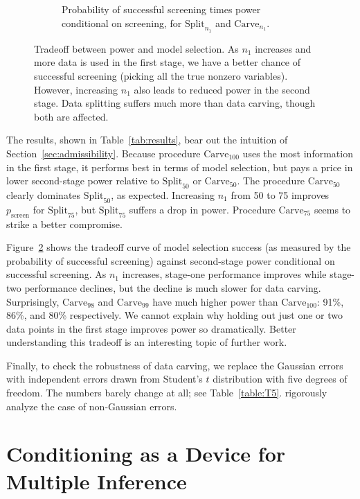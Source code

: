\documentclass{article}
\theoremstyle{definition}
\newcommand{\sampOrData}{data }
\begin{document}
\begin{figure}
\begin{subfigure}[t]{.4\textwidth}
    \caption{Probability of successful screening times power conditional on screening, for $\text{Split}_{n_1}$ and $\text{Carve}_{n_1}$.}
    \label{fig:lassoTRADE2}
  \end{subfigure}
  \caption{Tradeoff between power and model selection.
As $n_1$ increases and more data is used in the first stage, we have a better chance of successful screening (picking all the true nonzero variables). However, increasing $n_1$ also leads to reduced power in the second stage. Data splitting suffers much more than data carving, though both are affected.}
  \label{fig:lassoTRADEOFF}
\end{figure}


The results, shown in Table~\ref{tab:results}, bear out the intuition of Section~\ref{sec:admissibility}.
Because procedure $\text{Carve}_{100}$ uses the most information in the first stage, it performs best in terms of model selection, but pays a price in lower second-stage power relative to $\text{Split}_{50}$ or $\text{Carve}_{50}$. The procedure $\text{Carve}_{50}$ clearly dominates $\text{Split}_{50}$, as expected. Increasing $n_1$ from 50 to 75 improves $p_{\text{screen}}$ for $\text{Split}_{75}$, but $\text{Split}_{75}$ suffers a drop in power. Procedure $\text{Carve}_{75}$ seems to strike a better compromise.

Figure~\ref{fig:lassoTRADEOFF} shows the tradeoff curve of model selection success (as measured by the probability of successful screening) against second-stage power conditional on successful screening. As $n_1$ increases, stage-one performance improves while stage-two performance declines, but the decline is much slower for \sampOrData carving. Surprisingly, $\text{Carve}_{98}$ and $\text{Carve}_{99}$ have much higher power than $\text{Carve}_{100}$: 91\%, 86\%, and 80\% respectively. We cannot explain why holding out just one or two data points in the first stage improves power so dramatically. Better understanding this tradeoff is an interesting topic of further work.

Finally, to check the robustness of \sampOrData carving, we replace the Gaussian errors with independent errors drawn from Student's $t$ distribution with five degrees of freedom. The numbers barely change at all; see Table~\ref{table:T5}. \citet{tian2017asymptotics} rigorously analyze the case of non-Gaussian errors.


\section{Conditioning as a Device for Multiple Inference}\label{sec:multiple}
\end{document}
